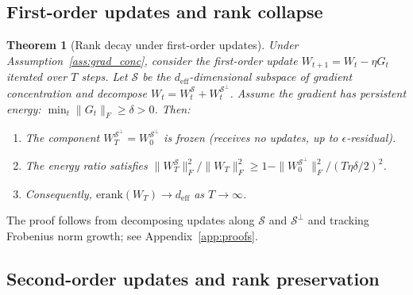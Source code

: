 \documentclass{article}
\newtheorem{theorem}{Theorem}
\newcommand{\erank}{\mathrm{erank}}
\newcommand{\cS}{\mathcal{S}}
\begin{document}
\subsection{First-order updates and rank collapse}

\begin{theorem}[Rank decay under first-order updates]
\label{thm:rank_decay}
Under Assumption~\ref{ass:grad_conc}, consider the first-order update $W_{t+1} = W_t - \eta G_t$ iterated over $T$ steps. Let $\cS$ be the $d_{\mathrm{eff}}$-dimensional subspace of gradient concentration and decompose $W_t = W_t^{\cS} + W_t^{\cS^\perp}$. Assume the gradient has persistent energy: $\min_t \|G_t\|_F \geq \delta > 0$. Then:
\begin{enumerate}[nosep]
    \item The component $W_T^{\cS^\perp} = W_0^{\cS^\perp}$ is frozen (receives no updates, up to $\epsilon$-residual).
    \item The energy ratio satisfies $\|W_T^{\cS}\|_F^2 / \|W_T\|_F^2 \geq 1 - \|W_0^{\cS^\perp}\|_F^2 / (T\eta\delta/2)^2$.
    \item Consequently, $\erank(W_T) \to d_{\mathrm{eff}}$ as $T \to \infty$.
\end{enumerate}
\end{theorem}

The proof follows from decomposing updates along $\cS$ and $\cS^\perp$ and tracking Frobenius norm growth; see Appendix~\ref{app:proofs}.

\subsection{Second-order updates and rank preservation}
\end{document}
